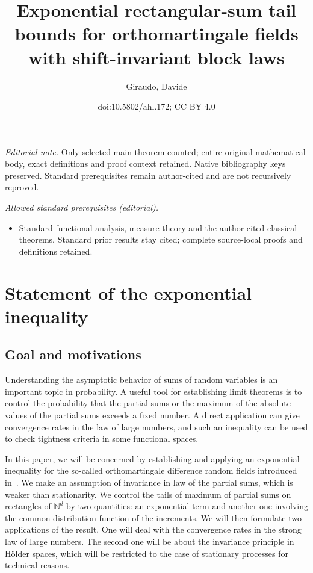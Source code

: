 \documentclass[10pt]{amsart}
\title{Exponential rectangular-sum tail bounds for orthomartingale fields with shift-invariant block laws}
\author{Giraudo, Davide}
\date{doi:10.5802/ahl.172; CC BY 4.0}
\theoremstyle{definition}\newtheorem{defi}[theo]{Definition}\newtheorem{rema}[theo]{Remark}\newtheorem{exam}[theo]{Example}\newtheorem{exem}[theo]{Example}\newtheorem{nota}[theo]{Notation}
\newcommand\N{\mathbb{N}}
\begin{document}
\maketitle
\noindent\textit{Editorial note.} Only selected main theorem counted; entire original mathematical body, exact definitions and proof context retained. Native bibliography keys preserved. Standard prerequisites remain author-cited and are not recursively reproved.\par\medskip
\noindent\textit{Allowed standard prerequisites (editorial).}\begin{itemize}
\item Standard functional analysis, measure theory and the author-cited classical theorems. Standard prior results stay cited; complete source-local proofs and definitions retained.
\end{itemize}\medskip

\section{Statement of the exponential inequality}

\subsection{Goal and motivations} Understanding the asymptotic behavior of sums of random variables is an important topic in probability. A useful tool for establishing limit theorems is to control the probability that the partial sums or the maximum of the absolute values of the partial sums exceeds a fixed number. A direct application can give convergence rates in the law of large numbers, and such an inequality can be used to check tightness criteria in some functional spaces.

In this paper, we will be concerned by establishing and applying an exponential inequality for the so-called orthomartingale difference random fields introduced in~\cite{MR0254912}. We make an assumption of invariance in law of the partial sums, which is weaker than stationarity. We control the tails of maximum of partial sums on rectangles of $\N^d$ by two quantities: an exponential term and another one involving the common distribution function of the increments. We will then formulate two applications of the result. One will deal with the convergence rates in the strong law of large numbers. The second one will be about the invariance principle in H\"older spaces, which will be restricted to the case of stationary processes for technical reasons.
\end{document}
